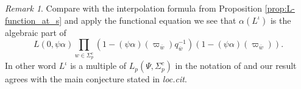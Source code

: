 \documentclass[leqno]{amsart}
\theoremstyle{definition}
\theoremstyle{remark}
\newtheorem{rem}[thm]{Remark}
\newcommand{\bw}{{\overline{w}}}
\begin{document}
\begin{rem}
Compare with the interpolation formula 
from Proposition \ref{prop:L-function_at_s}
and apply the functional equation we see that
$\alpha(L^\iota)$ is the algebraic part of 
\[
L(0,\psi\alpha)\prod_{w\in\Sigma_p^c}
(1-(\psi\alpha)(\varpi_\bw)q_\bw^{-1})
(1-(\psi\alpha)(\varpi_\bw)).
\]
In other word $L^\iota$ is a multiple
of $L_p(\Psi,\Sigma_p^c)$ in the notation
of \cite{Hsieh2010}
and our result agrees with the main conjecture
stated in \textit{loc.cit}.
\end{rem}







\end{document}
